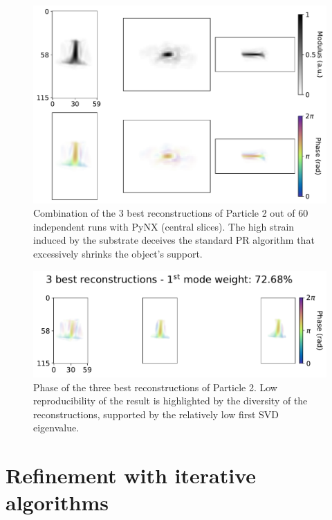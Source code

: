 \begin{figure}[H]
    \centering
    \includegraphics[width=\textwidth]{figures/Phasing/pynx_particle2_final.pdf}
    \caption{Combination of the 3 best reconstructions of Particle 2 out of 60 independent runs with PyNX (central slices). 
    The high strain induced by the substrate deceives the standard PR algorithm that excessively shrinks the object's support.}
    \label{fig:pynx_rec2}
\end{figure}
\begin{figure}[H]
    \centering
    \includegraphics[width=\textwidth]{figures/Phasing/modes_particle2-2.pdf}
    \caption{Phase of the three best reconstructions of Particle 2. Low reproducibility of the result is highlighted by 
    the diversity of the reconstructions, supported by the relatively low first SVD eigenvalue. }
    \label{fig:pynx_rec2_modes}
\end{figure}


\section{Refinement with iterative algorithms}\label{chp:refinement}

